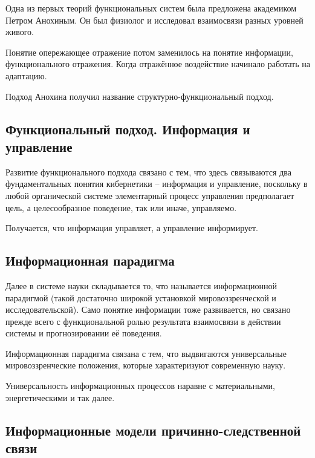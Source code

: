 \documentclass[main.tex]{subfiles}
\begin{document}

Одна из первых теорий функциональных систем была предложена академиком Петром Анохиным.
Он был физиолог и исследовал взаимосвязи разных уровней живого.

Понятие опережающее отражение потом заменилось на понятие информации, функционального отражения.
Когда отражённое воздействие начинало работать на адаптацию.

Подход Анохина получил название структурно-функциональный подход.

\subsection{Функциональный подход. Информация и управление}


Развитие функционального подхода связано с тем, что здесь связываются два фундаментальных понятия кибернетики -- информация и управление, поскольку в любой органической системе элементарный процесс управления предполагает цель, а целесообразное поведение, так или иначе, управляемо.

Получается, что информация управляет, а управление информирует.

\subsection{Информационная парадигма}


Далее в системе науки складывается то, что называется информационной парадигмой (такой достаточно широкой установкой мировоззренческой и исследовательской).
Само понятие информации тоже развивается, но связано прежде всего с функциональной ролью результата взаимосвязи в действии системы и прогнозировании её поведения.

Информационная парадигма связана с тем, что выдвигаются универсальные мировоззренческие положения, которые характеризуют современную науку.

Универсальность информационных процессов наравне с материальными, энергетическими и так далее.

\subsection{Информационные модели причинно-следственной связи}

\end{document}
